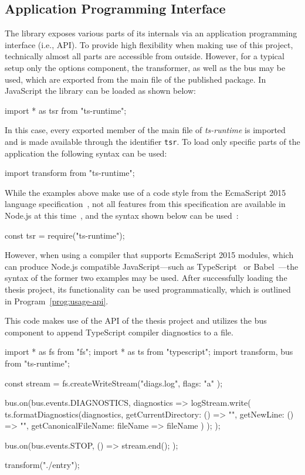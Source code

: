 \subsection{Application Programming Interface}
\label{sec:usage-api}

The library exposes various parts of its internals via an application programming interface (i.e., API). To provide high flexibility when making use of this project, technically almost all parts are accessible from outside. However, for a typical setup only the options component, the transformer, as well as the bus may be used, which are exported from the main file of the published package. In JavaScript the library can be loaded as shown below:
\begin{JsCode}[numbers=none]
import * as tsr from "ts-runtime";
\end{JsCode}
In this case, every exported member of the main file of \emph{ts-runtime} is imported and is made available through the identifier \texttt{tsr}. To load only specific parts of the application the following syntax can be used:
\begin{JsCode}[numbers=none]
import { transform } from "ts-runtime";
\end{JsCode}
While the examples above make use of a code style from the EcmaScript 2015 language specification~\cite[p.~302]{ES6Spec:Ecma:2015}, not all features from this specification are available in Node.js at this time~\cite{Node:Docs:ES6}, and the syntax shown below can be used~\cite{Node:API:Modules}:
\begin{JsCode}[numbers=none]
const tsr = require("ts-runtime");
\end{JsCode}
However, when using a compiler that supports EcmaScript 2015 modules, which can produce Node.js compatible JavaScript---such as TypeScript~\cite{TypeScriptHandbook:Modules} or Babel~\cite{Babel:Plugins}---the syntax of the former two examples may be used. After successfully loading the thesis project, its functionality can be used programmatically, which is outlined in Program~\ref{prog:usage-api}.
\begin{program}
\caption{This code makes use of the API of the thesis project and utilizes the bus component to append TypeScript compiler diagnostics to a file.}
\label{prog:usage-api}
\begin{JsCode}
import * as fs from "fs";
import * as ts from "typescript";
import { transform, bus } from "ts-runtime";

const stream = fs.createWriteStream("diags.log", { flags: "a" });

bus.on(bus.events.DIAGNOSTICS, diagnostics => {
  logStream.write(
    ts.formatDiagnostics(diagnostics, {
      getCurrentDirectory: () => "",
      getNewLine: () => "\n",
      getCanonicalFileName: fileName => fileName
    })
  );
});

bus.on(bus.events.STOP, () => {
  stream.end();
});

transform("./entry");
\end{JsCode}
\end{program}

